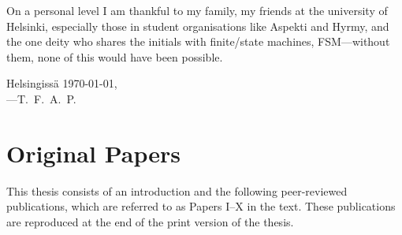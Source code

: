 \documentclass[officiallayout,final]{unihelcompling}
\begin{document}
On a personal level I am thankful to my family, my friends at the university of
Helsinki, especially those in student organisations like Aspekti and Hyrmy, and
the one deity who shares the initials with finite\-/state machines,
FSM---without them, none of this would have been possible.

\textfinnish{Helsingissä \today,\\
---T.~F.~A.~P.}

\chapter*{Original Papers}
\label{chap:papers}

This thesis consists of an introduction and the following peer-reviewed
publications, which are referred to as Papers I–X in the text. These
publications are reproduced at the end of the print version of the thesis.

\end{document}
